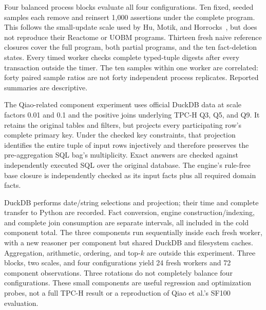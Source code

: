 Four balanced process blocks evaluate all four configurations. Ten fixed,
seeded samples each remove and reinsert 1,000 assertions under the complete
program. This follows the small-update scale used by Hu, Motik, and
Horrocks~\cite{hu2018}, but does not reproduce their Reactome or UOBM programs.
Thirteen fresh naive reference closures cover the full program, both partial
programs, and the ten fact-deletion states. Every timed worker checks complete
typed-tuple digests after every transaction outside the timer. The ten samples
within one worker are correlated: forty paired sample ratios are not forty
independent process replicates. Reported summaries are descriptive.

The Qiao-related component experiment uses official DuckDB  data
at scale factors 0.01 and 0.1 and the positive joins underlying TPC-H Q3, Q5,
and Q9. It retains the original tables and filters, but projects every
participating row's complete primary key. Under the checked key constraints,
that projection identifies the entire tuple of input rows injectively and
therefore preserves the pre-aggregation SQL bag's multiplicity. Exact answers
are checked against independently executed SQL over the original database.
The engine's rule-free base closure is independently checked as its input
facts plus all required domain facts.

DuckDB performs date/string selections and projection; their time and complete
transfer to Python are recorded. Fact conversion, engine construction/indexing,
and complete join consumption are separate intervals, all included in the cold
component total. The three components run sequentially inside each fresh
worker, with a new reasoner per component but shared DuckDB and filesystem
caches. Aggregation, arithmetic, ordering, and top-$k$ are outside
this experiment. Three blocks, two scales, and four configurations yield 24
fresh workers and 72 component observations. Three rotations do not completely
balance four configurations. These small components are useful regression and
optimization probes, not a full TPC-H result or a reproduction of Qiao et al.'s
SF100 evaluation.



